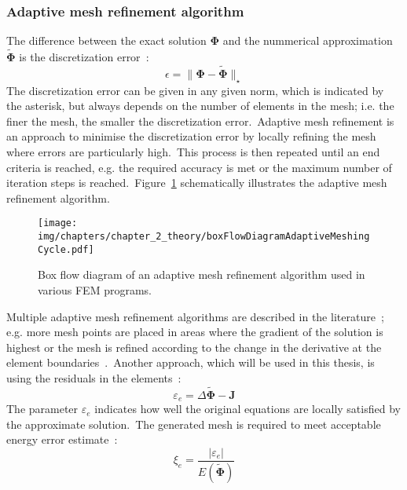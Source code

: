 \subsubsection{Adaptive mesh refinement algorithm}\label{subsubsec:adaptiveMeshRefinement}
The difference between the exact solution $\mathbf{\Phi}$ and the nummerical approximation $\tilde{\mathbf{\Phi}}$ is the discretization error~\cite{Ainsworth2011}:\
\begin{equation}
	\epsilon = \|\mathbf{\Phi} - \tilde{\mathbf{\Phi}}\|_{\star}
	\label{eqn:discretizationError} 
\end{equation}
The discretization error can be given in any given norm, which is indicated by the asterisk, but always depends on the number of elements in the mesh; i.e. the finer the mesh, the smaller the discretization error.\ Adaptive mesh refinement is an approach to minimise the discretization error by locally refining the mesh where errors are particularly high.\ This process is then repeated until an end criteria is reached, e.g. the required accuracy is met or the maximum number of iteration steps is reached.\ Figure~\ref{fig:boxFlowDiagramAdaptiveMeshAlgorithm} schematically illustrates the adaptive mesh refinement algorithm.\
\begin{figure}[htb]
	\centering
	\texttt{[image: img/chapters/chapter\_2\_theory/boxFlowDiagramAdaptiveMeshingCycle.pdf]}
	\caption[Box flow diagram of an adaptive mesh refinement algorithm]{Box flow diagram of an adaptive mesh refinement algorithm used in various FEM programs.}
	\label{fig:boxFlowDiagramAdaptiveMeshAlgorithm}
\end{figure}
Multiple adaptive mesh refinement algorithms are described in the literature~\cite{Ainsworth2011,Verfurth2013}; e.g. more mesh points are placed in areas where the gradient of the solution is highest or the mesh is refined according to the change in the derivative at the element boundaries~\cite{Babuska1981,Zienkiewicz1987}.\ Another approach, which will be used in this thesis, is using the residuals in the elements~\cite{Zienkiewicz1983}:\
\begin{equation}
	\varepsilon_{e} = \Delta \tilde{\mathbf{\Phi}} - \mathbf{J}
\end{equation}
The parameter $\varepsilon_{e}$ indicates how well the original equations are locally satisfied by the approximate solution.\ The generated mesh is required to meet acceptable energy error estimate~\cite{ansys2010}:\
\begin{equation}
	\xi_{e} = \frac{|\varepsilon_{e}|}{E(\tilde{\mathbf{\Phi}})}
	\label{eqn:localPercentEnergyErrorEstimate}
\end{equation}
